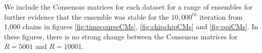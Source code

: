 \documentclass[]{article}
\begin{document}

We include the Consensus matrices for each dataset for a range of ensembles for further evidence that the ensemble was stable for the $10,000^{th}$ iteration from 1,000 chains in figures \ref{fig:timecourseCMs}, \ref{fig:chipchipCMs} and \ref{fig:ppiCMs}. In these figures, there is no strong change between the Consensus matrices for $R=5001$ and $R=10001$.
\end{document}
